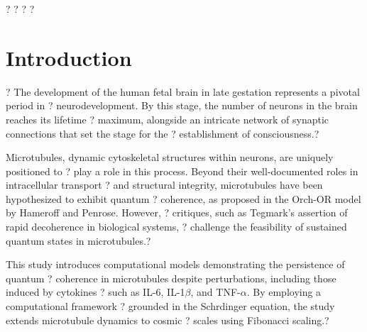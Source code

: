 ?%
?%
?%
?\section{Introduction}?
The development of the human fetal brain in late gestation represents a pivotal period in ?
neurodevelopment. By this stage, the number of neurons in the brain reaches its lifetime ?
maximum, alongside an intricate network of synaptic connections that set the stage for the ?
establishment of consciousness.?

Microtubules, dynamic cytoskeletal structures within neurons, are uniquely positioned to ?
play a role in this process. Beyond their well-documented roles in intracellular transport ?
and structural integrity, microtubules have been hypothesized to exhibit quantum ?
coherence, as proposed in the Orch-OR model by Hameroff and Penrose. However, ?
critiques, such as Tegmark's assertion of rapid decoherence in biological systems, ?
challenge the feasibility of sustained quantum states in microtubules.?

This study introduces computational models demonstrating the persistence of quantum ?
coherence in microtubules despite perturbations, including those induced by cytokines ?
such as IL-6, IL-1$\beta$, and TNF-$\alpha$. By employing a computational framework ?
grounded in the Schrdinger equation, the study extends microtubule dynamics to cosmic ?
scales using Fibonacci scaling.?


